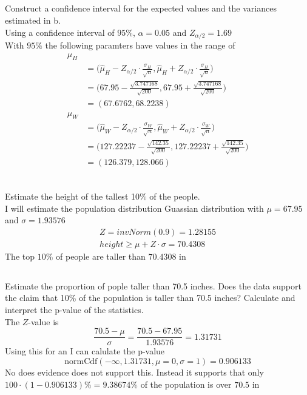\documentclass[12pt, letterpaper]{article}
\begin{document}
\subsection{}
Construct a confidence interval for the expected values and the variances estimated in b.
\\
Using a confidence interval of $95\%$, $\alpha = 0.05$ and $Z_{\alpha / 2} = 1.69$
\\
With $95\%$ the following paramters have values in the range of
\[
\begin{split}
\mu_H \\
&= \bigg(\hat{\mu}_H - Z_{\alpha / 2}\cdot \frac{\sigma_H}{\sqrt{n}},
\hat{\mu}_H + Z_{\alpha / 2}\cdot \frac{\sigma_H}{\sqrt{n}}\bigg) \\
&= \bigg(67.95 - \frac{\sqrt{3.747168}}{\sqrt{200}}, 67.95 + \frac{\sqrt{3.747168}}{\sqrt{200}}\bigg) \\
&= (67.6762, 68.2238) \\
\mu_W \\
&= \bigg(\hat{\mu}_W - Z_{\alpha / 2}\cdot \frac{\sigma_W}{\sqrt{n}},
\hat{\mu}_W + Z_{\alpha / 2}\cdot \frac{\sigma_W}{\sqrt{n}}\bigg) \\
&= \bigg(127.22237 - \frac{\sqrt{142.35}}{\sqrt{200}}, 127.22237 + \frac{\sqrt{142.35}}{\sqrt{200}}\bigg) \\
&= (126.379, 128.066) \\
\end{split}
\]

\subsection{}
Estimate the height of the tallest 10\% of the people.
\\
I will estimate the population distribution Guassian distribution with 
$\mu = 67.95$ and $\sigma = 1.93576$
\[
\begin{split}
Z = invNorm(0.9) = 1.28155 \\
height \ge \mu + Z \cdot \sigma = 70.4308
\end{split}
\]
The top $10\%$ of people are taller than $70.4308$ in

\subsection{}
Estimate the proportion of pople taller than 70.5 inches. Does the data support the 
claim that 10\% of the population is taller than 70.5 inches? Calculate and interpret the
p-value of the statistics.
\\
The $Z$-value is
\[
\frac{70.5 - \mu}{\sigma} = \frac{70.5-67.95}{1.93576} = 1.31731
\]
Using this for an I can calulate the p-value
\[
\textrm{normCdf}(-\infty, 1.31731, \mu = 0, \sigma=1) = 0.906133
\]
No does evidence does not support this. Instead it supports that only 
$100\cdot(1 - 0.906133)\% = 9.38674\%$ of the population is over $70.5$ in
\end{document}
